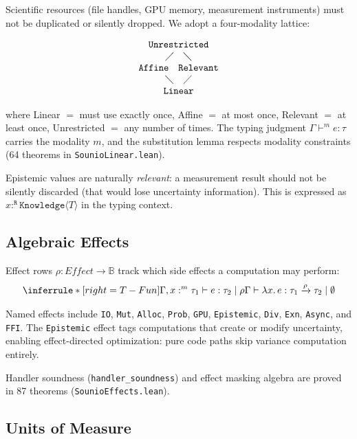 \documentclass[acmsmall,screen,review,anonymous]{acmart}
\newcommand{\know}[1]{\texttt{Knowledge}\langle #1 \rangle}
\begin{document}
Scientific resources (file handles, GPU memory, measurement instruments)
must not be duplicated or silently dropped.
We adopt a four-modality lattice:

\[
\begin{array}{c}
\texttt{Unrestricted} \\
\diagup \quad \diagdown \\
\texttt{Affine} \quad \texttt{Relevant} \\
\diagdown \quad \diagup \\
\texttt{Linear}
\end{array}
\]

\noindent where Linear $=$ must use exactly once, Affine $=$ at most once,
Relevant $=$ at least once, Unrestricted $=$ any number of times.
The typing judgment $\Gamma \vdash^m e : \tau$ carries the modality $m$,
and the substitution lemma respects modality constraints (64 theorems
in \texttt{SounioLinear.lean}).

Epistemic values are naturally \emph{relevant}: a measurement result
should not be silently discarded (that would lose uncertainty information).
This is expressed as $x :^{\texttt{R}} \know{T}$ in the typing context.

\subsection{Algebraic Effects}

Effect rows $\rho : \textit{Effect} \to \mathbb{B}$ track which
side effects a computation may perform:
\[
\inferrule*[right=T-Fun]
  {\Gamma, x :^m \tau_1 \vdash e : \tau_2 \mid \rho}
  {\Gamma \vdash \lambda x.\, e : \tau_1 \xrightarrow{\rho} \tau_2 \mid \emptyset}
\]

Named effects include \texttt{IO}, \texttt{Mut}, \texttt{Alloc},
\texttt{Prob}, \texttt{GPU}, \texttt{Epistemic}, \texttt{Div},
\texttt{Exn}, \texttt{Async}, and \texttt{FFI}.
The \texttt{Epistemic} effect tags computations that create or
modify uncertainty, enabling effect-directed optimization:
pure code paths skip variance computation entirely.

Handler soundness (\texttt{handler\_soundness}) and effect masking
algebra are proved in 87 theorems (\texttt{SounioEffects.lean}).

\subsection{Units of Measure}
\end{document}
